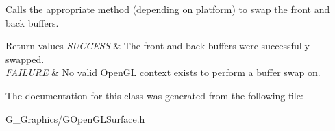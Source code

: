Calls the appropriate method (depending on platform) to swap the front and back buffers. 


\begin{DoxyRetVals}{Return values}
{\em S\+U\+C\+C\+E\+SS} & The front and back buffers were successfully swapped. \\
\hline
{\em F\+A\+I\+L\+U\+RE} & No valid Open\+GL context exists to perform a buffer swap on. \\
\hline
\end{DoxyRetVals}


The documentation for this class was generated from the following file\+:\begin{DoxyCompactItemize}
\item 
G\+\_\+\+Graphics/G\+Open\+G\+L\+Surface.\+h\end{DoxyCompactItemize}
